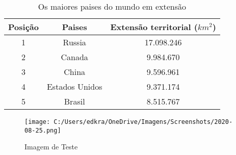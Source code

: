 \documentclass[a4paper,12pt]{article}
\begin{document}
\begin{table}[h]
\centering
\caption{Os maiores paises do mundo em extensão } \vspace*{0.5cm}
\begin{tabular}{c |cc}
Posição & Paises & Extensão territorial ($ km^{2} $)\\
\hline
1 & Russia & 17.098.246\\
2 & Canada & 9.984.670\\
3 & China & 9.596.961\\
4 & Estados Unidos & 9.371.174\\
5 & Brasil & 8.515.767
\end{tabular}
\end{table}

\begin{figure}[h]
	\centering
	\texttt{[image: C:/Users/edkra/OneDrive/Imagens/Screenshots/2020-08-25.png]}
	\label{ImagemTeste}
	\caption{Imagem de Teste}
\end{figure}
\end{document}
